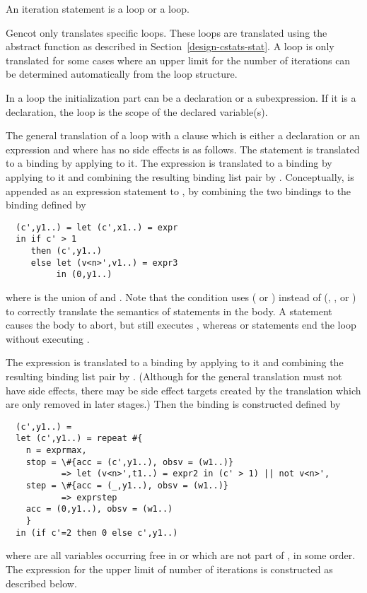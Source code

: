 An iteration statement is a  loop or a  loop.

Gencot only translates specific  loops. These loops are translated using the abstract function  as described
in Section~\ref{design-cstats-stat}. A  loop is only translated for some cases where an upper limit for the number of 
iterations can be determined automatically from the loop structure.

In a  loop the initialization part can be a declaration or a subexpression. If it is a declaration, the  loop
is the scope of the declared variable(s).

The general translation of a loop  with a clause  which is either a declaration or an expression
and where  has no side effects
is as follows. The statement  is translated to a binding  by applying  to it. The expression
 is translated to a binding  by applying  to it and combining the resulting binding
list pair by . Conceptually,  is appended as an expression statement to , by combining the two bindings
to the binding  defined by
\begin{verbatim}
  (c',y1..) = let (c',x1..) = expr
  in if c' > 1
     then (c',y1..)
     else let (v<n>',v1..) = expr3
          in (0,y1..)
\end{verbatim}
where  is the union of  and . Note that the condition uses  ( or ) 
instead of  (, , or ) to correctly translate the semantics of  
statements in the body. A  statement causes the body to abort, but still executes , whereas  
or  statements end the loop without executing .

The expression  is translated to a binding  by applying  to it and combining 
the resulting binding list pair by . (Although for the general translation  must not have side effects, there
may be side effect targets  created by the translation which are only removed in later stages.)
Then the binding  is constructed defined by
\begin{verbatim}
  (c',y1..) =
  let (c',y1..) = repeat #{
    n = exprmax,
    stop = \#{acc = (c',y1..), obsv = (w1..)} 
           => let (v<n>',t1..) = expr2 in (c' > 1) || not v<n>',
    step = \#{acc = (_,y1..), obsv = (w1..)} 
           => exprstep
    acc = (0,y1..), obsv = (w1..)
    }
  in (if c'=2 then 0 else c',y1..)
\end{verbatim}
where  are all variables occurring free in  or  which are not part of , in some order.
The expression  for the upper limit of number of iterations is constructed as described below.

